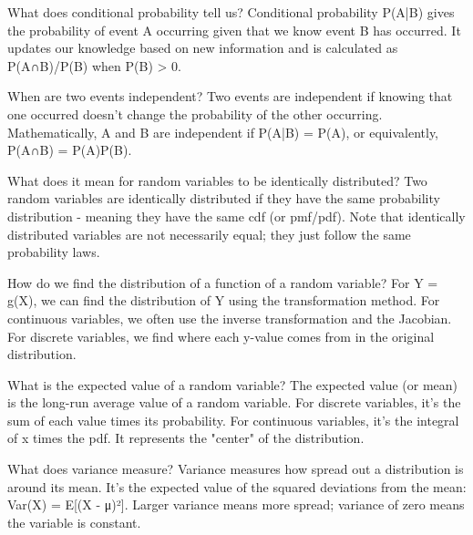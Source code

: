 \documentclass[avery5371,grid]{flashcards}
\begin{document}
\begin{flashcard}{What does conditional probability tell us?}
Conditional probability P(A|B) gives the probability of event A occurring given that we know event B has occurred. It updates our knowledge based on new information and is calculated as P(A∩B)/P(B) when P(B) > 0.
\end{flashcard}

\begin{flashcard}[Independence]{When are two events independent?}
Two events are independent if knowing that one occurred doesn't change the probability of the other occurring. Mathematically, A and B are independent if P(A|B) = P(A), or equivalently, P(A∩B) = P(A)P(B).
\end{flashcard}

\begin{flashcard}{What does it mean for random variables to be identically distributed?}
Two random variables are identically distributed if they have the same probability distribution - meaning they have the same cdf (or pmf/pdf). Note that identically distributed variables are not necessarily equal; they just follow the same probability laws.
\end{flashcard}

\begin{flashcard}{How do we find the distribution of a function of a random variable?}
For Y = g(X), we can find the distribution of Y using the transformation method. For continuous variables, we often use the inverse transformation and the Jacobian. For discrete variables, we find where each y-value comes from in the original distribution.
\end{flashcard}

\begin{flashcard}{What is the expected value of a random variable?}
The expected value (or mean) is the long-run average value of a random variable. For discrete variables, it's the sum of each value times its probability. For continuous variables, it's the integral of x times the pdf. It represents the "center" of the distribution.
\end{flashcard}

\begin{flashcard}[Variance]{What does variance measure?}
Variance measures how spread out a distribution is around its mean. It's the expected value of the squared deviations from the mean: Var(X) = E[(X - μ)²]. Larger variance means more spread; variance of zero means the variable is constant.
\end{flashcard}
\end{document}
